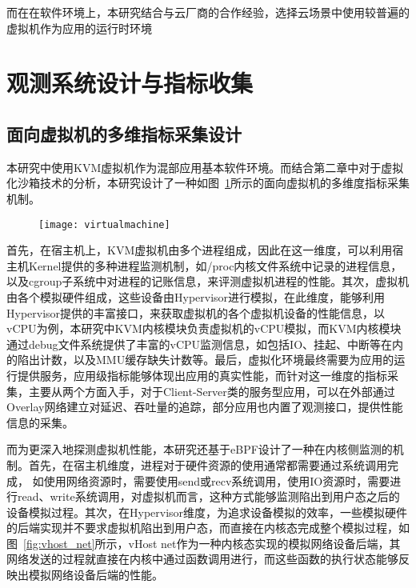 而在在软件环境上，本研究结合与云厂商的合作经验，选择云场景中使用较普遍的虚拟机作为应用的运行时环境

\section{观测系统设计与指标收集}

\subsection{面向虚拟机的多维指标采集设计}


本研究中使用KVM虚拟机作为混部应用基本软件环境。而结合第二章中对于虚拟化沙箱技术的分析，本研究设计了一种如图~\ref{fig:virtualmachine}所示的面向虚拟机的多维度指标采集机制。

\begin{figure}[!htbp]
    \centering
    \texttt{[image: virtualmachine]}
    \label{fig:virtualmachine}
\end{figure}

首先，在宿主机上，KVM虚拟机由多个进程组成，因此在这一维度，可以利用宿主机Kernel提供的多种进程监测机制，如/proc内核文件系统中记录的进程信息，以及cgroup子系统中对进程的记账信息，来评测虚拟机进程的性能。其次，虚拟机由各个模拟硬件组成，这些设备由Hypervisor进行模拟，在此维度，能够利用Hypervisor提供的丰富接口，来获取虚拟机的各个虚拟机设备的性能信息，以vCPU为例，本研究中KVM内核模块负责虚拟机的vCPU模拟，而KVM内核模块通过debug文件系统提供了丰富的vCPU监测信息，如包括IO、挂起、中断等在内的陷出计数，以及MMU缓存缺失计数等。最后，虚拟化环境最终需要为应用的运行提供服务，应用级指标能够体现出应用的真实性能，而针对这一维度的指标采集，主要从两个方面入手，对于Client-Server类的服务型应用，可以在外部通过Overlay网络建立对延迟、吞吐量的追踪，部分应用也内置了观测接口，提供性能信息的采集。

而为更深入地探测虚拟机性能，本研究还基于eBPF设计了一种在内核侧监测的机制。首先，在宿主机维度，进程对于硬件资源的使用通常都需要通过系统调用完成， 如使用网络资源时，需要使用send或recv系统调用，使用IO资源时，需要进行read、write系统调用，对虚拟机而言，这种方式能够监测陷出到用户态之后的设备模拟过程。其次，在Hypervisor维度，为追求设备模拟的效率，一些模拟硬件的后端实现并不要求虚拟机陷出到用户态，而直接在内核态完成整个模拟过程，如图~\ref{fig:vhost_net}所示，vHost net作为一种内核态实现的模拟网络设备后端，其网络发送的过程就直接在内核中通过函数调用进行，而这些函数的执行状态能够反映出模拟网络设备后端的性能。

